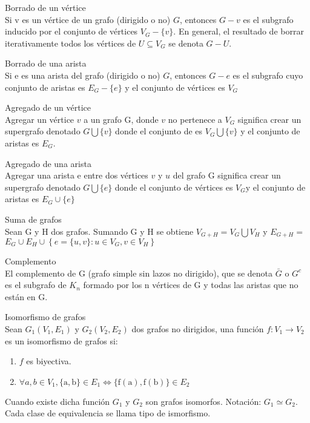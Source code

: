 \documentclass{article}
\begin{document}
\begin{defn}
Borrado de un vértice \\ Si v es un vértice de un grafo (dirigido o no) $G$, entonces $G-v$ es el subgrafo inducido por el conjunto de vértices $V_{G}-\{v\} .$ En general, el resultado de borrar iterativamente todos los vértices de $U \subseteq V_{G}$ se denota $G-U$.
\end{defn}

\begin{defn}
Borrado de una arista \\ Si e es una arista del grafo (dirigido o no) $G$, entonces $G-e$ es el subgrafo cuyo conjunto de aristas es $E_{G}-\{e\}$ y el conjunto de vértices es $V_{G}$
\end{defn}

\begin{defn}
Agregado de un vértice \\ Agregar un vértice $v$ a un grafo $\mathrm{G}$, donde $v$ no pertenece a $V_{G}$ significa crear un supergrafo denotado $G \bigcup\{v\}$ donde el conjunto de es $V_{G} \bigcup\{v\}$ y el conjunto de aristas es $E_{G}$.
\end{defn}

\begin{defn}
Agregado de una arista \\ Agregar una arista e entre dos vértices $v$ y $u$ del grafo $\mathrm{G}$ significa crear un supergrafo denotado $G \bigcup\{e\}$ donde el conjunto de vértices es $V_{G} \mathrm{y}$ el conjunto de aristas es $E_{G} \cup\{e\}$
\end{defn}

\begin{defn}
Suma de grafos \\ Sean G y H dos grafos. Sumando $\mathrm{G}$ y $\mathrm{H}$ se obtiene $V_{G+H}=V_{G} \bigcup V_{H}$ y $E_{G+H}=$ $E_{G} \cup E_{H} \cup\left\{e=\{u, v\}: u \in V_{G}, v \in V_{H}\right\}$
\end{defn}

\begin{defn}
Complemento \\ El complemento de G (grafo simple sin lazos no dirigido), que se denota $\bar{G}$ o $G^{c}$ es el subgrafo de $K_{n}$ formado por los n vértices de G y todas las aristas que no están en $\mathrm{G}$.
\end{defn}

\begin{defn}
Isomorfismo de grafos \\ Sean $G_{1}\left(V_{1}, E_{1}\right)$ y $G_{2}\left(V_{2}, E_{2}\right)$ dos grafos no dirigidos, una función $f: V_{1} \rightarrow V_{2}$ es un isomorfismo de grafos si:
\begin{enumerate}
    \item $f$ es biyectiva.
    \item $\forall a, b \in V_{1},\{\mathrm{a}, \mathrm{b}\} \in E_{1} \Leftrightarrow\{\mathrm{f}(\mathrm{a}), \mathrm{f}(\mathrm{b})\} \in E_{2}$
\end{enumerate}
Cuando existe dicha función $G_{1}$ y $G_{2}$ son grafos isomorfos. Notación: $G_{1} \simeq G_{2} .$ Cada clase de equivalencia se llama tipo de ismorfismo.
\end{defn}
\end{document}
